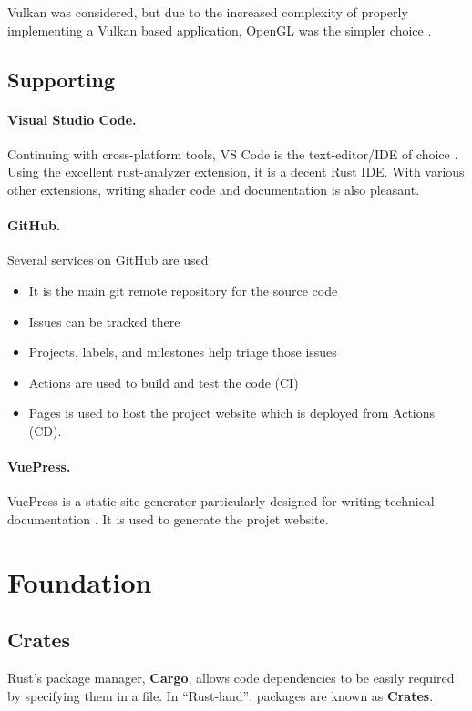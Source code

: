 Vulkan was considered, but due to the increased complexity of properly implementing a Vulkan based application, OpenGL was the simpler choice \autocite{vulkan_vulkan_2020}.

\subsection{Supporting}

\paragraph{Visual Studio Code.}
Continuing with cross-platform tools, VS Code is the text-editor/IDE of choice \autocite{visual_studio_code_visual_2020}.
Using the excellent rust-analyzer extension, it is a decent Rust IDE\@.
With various other extensions, writing shader code and documentation is also pleasant.

\paragraph{GitHub.}
Several services on GitHub are used:
\begin{itemize}
  \item It is the main git remote repository for the source code
  \item Issues can be tracked there
  \item Projects, labels, and milestones help triage those issues
  \item Actions are used to build and test the code (CI)
  \item Pages is used to host the project website which is deployed from Actions (CD).
\end{itemize}
\autocite{github_github_2020}

\paragraph{VuePress.}
VuePress is a static site generator particularly designed for writing technical documentation \autocite{vuepress_vuepress_2020}.
It is used to generate the projet website.

\section{Foundation}\label{sec:foundation}

\subsection{Crates}
Rust's package manager, \textbf{Cargo}, allows code dependencies to be easily required by specifying them in a  file.
In “Rust-land”, packages are known as \textbf{Crates}.

